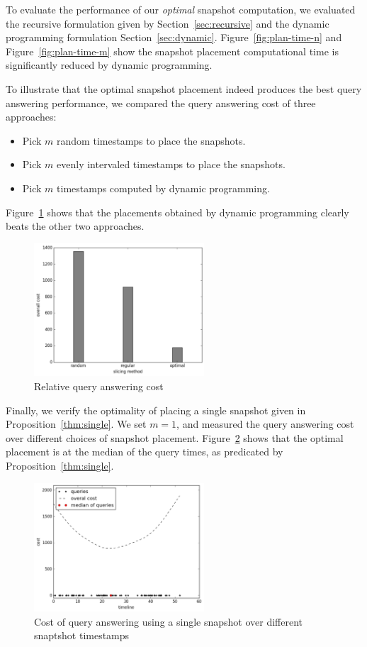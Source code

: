 To evaluate the performance of our {\em optimal} snapshot computation, we
evaluated the recursive formulation given by Section~\ref{sec:recursive}
and the dynamic programming formulation Section~\ref{sec:dynamic}.
Figure~\ref{fig:plan-time-n} and Figure~\ref{fig:plan-time-m} show the
snapshot placement computational time is significantly reduced by dynamic
programming.

To illustrate that the optimal snapshot placement indeed produces the best query
answering performance, we compared the query answering cost of three approaches:
\begin{itemize}
    \item Pick $m$ random timestamps to place the snapshots.
    \item Pick $m$ evenly intervaled timestamps to place the snapshots.
    \item Pick $m$ timestamps computed by dynamic programming.
\end{itemize}
Figure~\ref{fig:comparison} shows that the placements obtained by dynamic
programming clearly beats the other two approaches.

\begin{figure}[tb]
    \label{fig:comparison}
    \centering
    \includegraphics[width=2.5in]{figs/cuts_cost.pdf}
    \caption{Relative query answering cost}
\end{figure}

Finally, we verify the optimality of placing a single snapshot given in
Proposition~\ref{thm:single}.  We set $m=1$, and measured the query answering
cost over different choices of snapshot placement.  Figure~\ref{fig:cost-single}
shows that the optimal placement is at the median of the query times, as
predicated by Proposition~\ref{thm:single}.

\begin{figure}[tb]
    \label{fig:cost-single}
    \centering
    \includegraphics[width=2.5in]{figs/single.pdf}
    \caption{Cost of query answering using a single snapshot over different
    snaptshot timestamps}
\end{figure}

